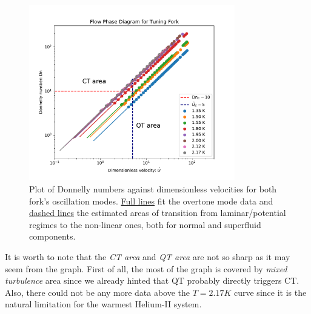 \begin{figure}[h]
	\centering
	\includegraphics[width=0.8\textwidth]{graphics/results/fork-phase}
	\caption{Plot of Donnelly numbers against dimensionless velocities for both fork's oscillation modes. \underline{Full lines} fit the overtone mode data and \underline{dashed lines} the estimated areas of transition from laminar/potential regimes to the non-linear ones, both for normal and superfluid components.}
	\label{fork-flow_phase}
\end{figure}

It is worth to note that the \textit{CT area} and \textit{QT area} are not so sharp as it may seem from the graph. First of all, the most of the graph is covered by \textit{mixed turbulence} area since we already hinted that QT probably directly triggers CT.\\
Also, there could not be any more data above the $T=2.17\unit{K}$ curve since it is the natural limitation for the warmest Helium-II system.
